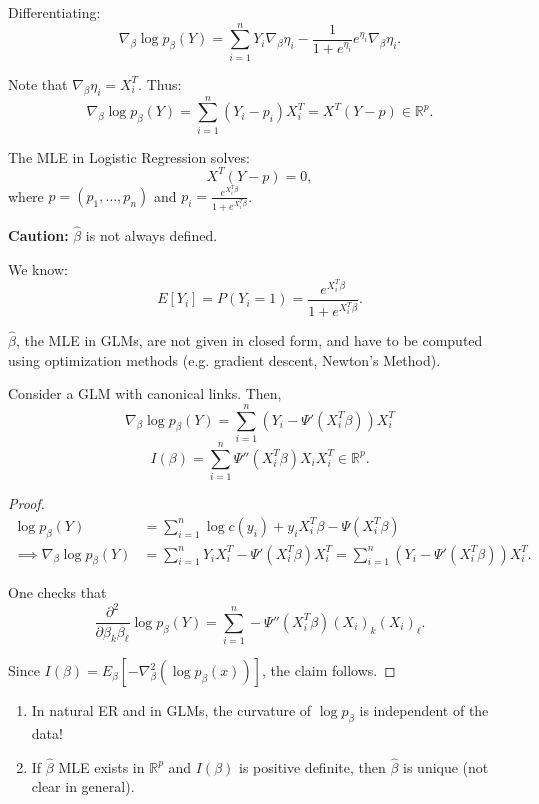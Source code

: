 \documentclass[open=any, 11pt,paper=A4]{scrreprt}
\begin{document}
Differentiating:
\[
\nabla_\beta \log p_\beta(Y) = \sum_{i=1}^{n} Y_i \nabla_\beta \eta_i - \frac{1}{1+e^{\eta_i}} e^{\eta_i}\nabla_\beta \eta_i.
\]

Note that \(\nabla_\beta \eta_i = X_i^T\). Thus:
\[
\nabla_\beta \log p_\beta(Y) = \sum_{i=1}^{n} (Y_i - p_i)X_i^T = X^T (Y-p) \in \mathbb{R}^p.
\]

The MLE in Logistic Regression solves:
\[
X^T(Y-p) = 0,
\]
where \(p =(p_1,\hdots, p_n)\) and \( p_i = \frac{e^{X_i^T \beta}}{1+e^{X_i^T \beta}}\).

\textbf{Caution:} \(\hat{\beta}\) is not always defined.

We know:
\[
E[Y_i] = P(Y_i =1) = \frac{e^{X_i^T \beta}}{1+e^{X_i^T \beta}}.
\]

\begin{remark}
    \(\hat{\beta}\), the MLE in GLMs, are not given in closed form, and have to be computed using optimization methods (e.g. gradient descent, Newton's Method).
\end{remark}


\begin{lemma}
    Consider a GLM with canonical links. Then,
    \[
    \nabla_\beta \log p_\beta (Y)= \sum_{i=1}^{n} (Y_i - \Psi'(X_i^T \beta))X_i^T
    \]
    \[
    I(\beta) = \sum_{i=1}^{n} \Psi''(X_i^T \beta) X_i X_i^T \in \mathbb{R}^p.
    \]

    \begin{proof}
        \begin{align*}
            \log p_\beta(Y)&=  \sum_{i=1}^{n} \log c(y_i)+ y_i X_i^T\beta - \Psi (X_i^T \beta )\\
            \implies \nabla_\beta \log p_\beta (Y) &= \sum_{i=1}^{n} Y_i X_i^T - \Psi'(X_i^T \beta)X_i^T = \sum_{i=1}^{n} (Y_i - \Psi'(X_i^T \beta))X_i^T.
        \end{align*}

        One checks that
        \[
        \frac{\partial^2}{\partial \beta_k \beta_\ell}\log p_\beta(Y)= \sum_{i=1}^{n} -\Psi''(X^T_i \beta) (X_i)_k (X_i)_\ell.
        \]

        Since \(I(\beta)= E_\beta[- \nabla_\beta^2 (\log p_\beta(x))]\), the claim follows.
    \end{proof}
\end{lemma}

\begin{remark}
    \begin{enumerate}
        \item In natural ER and in GLMs, the curvature of \(\log p_\beta\) is independent of the data!
        \item If \(\hat{\beta}\) MLE exists in \(\mathbb{R}^p\) and \(I(\beta)\) is positive definite, then \(\hat{\beta}\) is unique (not clear in general).
    \end{enumerate}
\end{remark}
\end{document}
